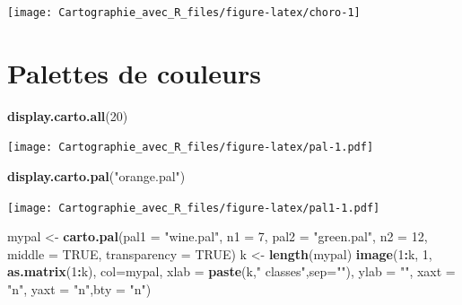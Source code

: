 \documentclass[]{book}
\newenvironment{Shaded}{\begin{snugshade}}{\end{snugshade}}
\newcommand{\DataTypeTok}[1]{\textcolor[rgb]{0.13,0.29,0.53}{#1}}
\newcommand{\DecValTok}[1]{\textcolor[rgb]{0.00,0.00,0.81}{#1}}
\newcommand{\KeywordTok}[1]{\textcolor[rgb]{0.13,0.29,0.53}{\textbf{#1}}}
\newcommand{\NormalTok}[1]{#1}
\newcommand{\OperatorTok}[1]{\textcolor[rgb]{0.81,0.36,0.00}{\textbf{#1}}}
\newcommand{\OtherTok}[1]{\textcolor[rgb]{0.56,0.35,0.01}{#1}}
\newcommand{\StringTok}[1]{\textcolor[rgb]{0.31,0.60,0.02}{#1}}
\begin{document}
\begin{center}\texttt{[image: Cartographie\_avec\_R\_files/figure-latex/choro-1]} \end{center}

\hypertarget{palettes-de-couleurs}{%
\section{Palettes de couleurs}\label{palettes-de-couleurs}}

\begin{Shaded}
\begin{Highlighting}[]
\KeywordTok{display.carto.all}\NormalTok{(}\DecValTok{20}\NormalTok{)}
\end{Highlighting}
\end{Shaded}

\texttt{[image: Cartographie\_avec\_R\_files/figure-latex/pal-1.pdf]}

\begin{Shaded}
\begin{Highlighting}[]
\KeywordTok{display.carto.pal}\NormalTok{(}\StringTok{"orange.pal"}\NormalTok{)}
\end{Highlighting}
\end{Shaded}

\texttt{[image: Cartographie\_avec\_R\_files/figure-latex/pal1-1.pdf]}

\begin{Shaded}
\begin{Highlighting}[]
\NormalTok{mypal <-}\StringTok{ }\KeywordTok{carto.pal}\NormalTok{(}\DataTypeTok{pal1 =} \StringTok{"wine.pal"}\NormalTok{, }\DataTypeTok{n1 =} \DecValTok{7}\NormalTok{, }\DataTypeTok{pal2 =} \StringTok{"green.pal"}\NormalTok{, }\DataTypeTok{n2 =} \DecValTok{12}\NormalTok{,}
                   \DataTypeTok{middle =} \OtherTok{TRUE}\NormalTok{, }\DataTypeTok{transparency =} \OtherTok{TRUE}\NormalTok{)}
\NormalTok{k <-}\StringTok{ }\KeywordTok{length}\NormalTok{(mypal)}
\KeywordTok{image}\NormalTok{(}\DecValTok{1}\OperatorTok{:}\NormalTok{k, }\DecValTok{1}\NormalTok{, }\KeywordTok{as.matrix}\NormalTok{(}\DecValTok{1}\OperatorTok{:}\NormalTok{k), }\DataTypeTok{col=}\NormalTok{mypal, }\DataTypeTok{xlab =} \KeywordTok{paste}\NormalTok{(k,}\StringTok{" classes"}\NormalTok{,}\DataTypeTok{sep=}\StringTok{""}\NormalTok{),}
      \DataTypeTok{ylab =} \StringTok{""}\NormalTok{, }\DataTypeTok{xaxt =} \StringTok{"n"}\NormalTok{, }\DataTypeTok{yaxt =} \StringTok{"n"}\NormalTok{,}\DataTypeTok{bty =} \StringTok{"n"}\NormalTok{)}
\end{Highlighting}
\end{Shaded}
\end{document}

